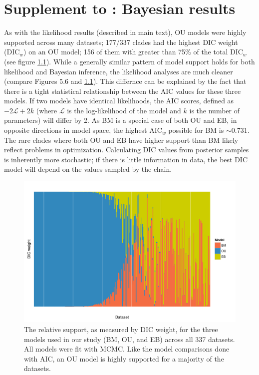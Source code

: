 \chapter{Supplement to : Bayesian results}

As with the likelihood results (described in main text), OU models were highly supported across many datasets; 
177/337 clades had the highest DIC weight (DIC$_w$) on an OU model; 156 of them with greater than 75\% of the total DIC$_w$ (see figure \ref{fig:supp-dic-support}). While a generally similar pattern of model support holds for both likelihood and Bayesian inference, the likelihood analyses are much cleaner (compare Figures 5.6 and \ref{fig:supp-dic-support}). This differnce can be explained by the fact that there is a tight statistical relationship between the AIC values for these three models. If two models have identical likelihoods, the AIC scores, defined as $-\text{2}\mathcal{L} + \text{2}k$ (where $\mathcal{L}$ is the log-likelihood of the model and $k$ is the number of parameters) will differ by 2. As BM is a special case of both OU and EB, in opposite directions in model space, the highest AIC$_w$ possible for BM is $\sim$0.731. The rare clades where both OU and EB have higher support than BM likely reflect problems in optimization. Calculating DIC values from posterior samples is inherently more stochastic; if there is little information in data, the best DIC model will depend on the values sampled by the chain.

\begin{figure}[p]
  \centering
  \includegraphics[angle=90, origin=c, scale=0.8]{figs/dic-support}
  \caption[Relative support for models across angiosperm datasets (Bayesian)]{The relative support, as measured by DIC weight, for the three models used in our study (BM, OU, and EB) across all 337 datasets. All models were fit with MCMC. Like the model comparisons done with AIC, an OU model is highly supported for a majority of the datasets.}
  \label{fig:supp-dic-support}
\end{figure} 

